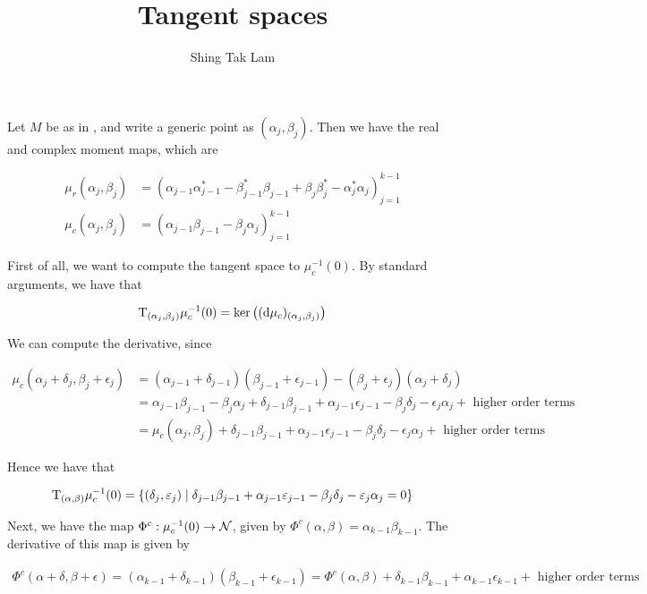 \documentclass{article}
\title{Tangent spaces}
\author{Shing Tak Lam}
\begin{document}
\maketitle

Let \(M\) be as in \cite{kobak_classical_1996}, and write a generic point as \((\alpha_j, \beta_j)\). Then we have the real and complex moment maps, which are

\begin{align*}
    \mu_r(\alpha_j, \beta_j) &= (\alpha_{j-1}\alpha_{j-1}^* - \beta_{j-1}^*\beta_{j-1}+\beta_j\beta_j^* - \alpha_j^*\alpha_j)_{j=1}^{k-1} \\
    \mu_c(\alpha_j, \beta_j) &= (\alpha_{j-1}\beta_{j-1} - \beta_j\alpha_j)_{j=1}^{k-1}
\end{align*}

First of all, we want to compute the tangent space to \(\mu_c^{-1}(0)\). By standard arguments, we have that

\[\mathrm{T}_{(\alpha_j, \beta_j)}\mu_c^{-1}(0) = \ker\left((\dd\mu_c)_{(\alpha_j, \beta_j)}\right)\]

We can compute the derivative, since

\begin{align*}
    \mu_c(\alpha_j + \delta_j, \beta_j + \epsilon_j) &= (\alpha_{j-1} + \delta_{j-1})(\beta_{j-1} + \epsilon_{j-1}) - (\beta_j + \epsilon_j)(\alpha_j + \delta_j) \\
    &= \alpha_{j-1}\beta_{j-1} - \beta_j\alpha_j + \delta_{j-1}\beta_{j-1} + \alpha_{j-1}\epsilon_{j-1} - \beta_j\delta_j - \epsilon_j\alpha_j + \text{ higher order terms}\\
    &= \mu_c(\alpha_j, \beta_j) + \delta_{j-1}\beta_{j-1} + \alpha_{j-1}\epsilon_{j-1} - \beta_j\delta_j - \epsilon_j\alpha_j + \text{ higher order terms}
\end{align*}

Hence we have that

\[\mathrm{T}_{(\alpha, \beta)}\mu_c^{-1}(0) = \left\{(\delta_j, \varepsilon_j) \mid \delta_{j-1}\beta_{j-1} + \alpha_{j-1}\varepsilon_{j-1} - \beta_j\delta_j - \varepsilon_j\alpha_j = 0\right\}\]

Next, we have the map \(\Phi^c : \mu_c^{-1}(0) \to \mathcal{N}\), given by \(\Phi^c(\alpha, \beta) = \alpha_{k-1}\beta_{k-1}\). The derivative of this map is given by

\begin{align*}
    \Phi^c(\alpha + \delta, \beta + \epsilon) = (\alpha_{k-1} + \delta_{k-1})(\beta_{k-1} + \epsilon_{k-1}) = \Phi^c(\alpha, \beta) + \delta_{k-1}\beta_{k-1} + \alpha_{k-1}\epsilon_{k-1} + \text{ higher order terms}
\end{align*}
\end{document}
